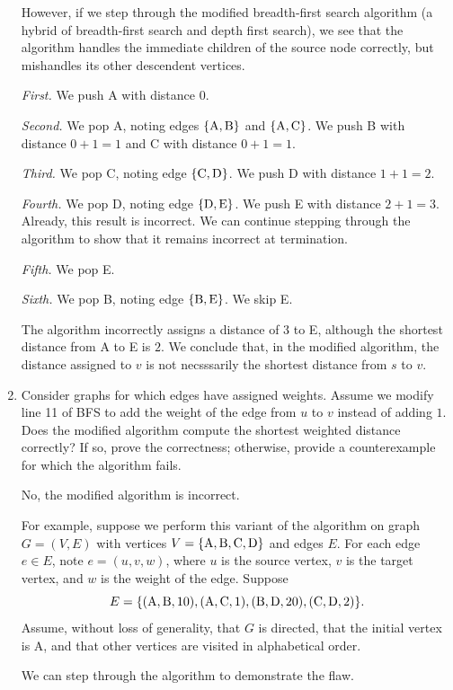\begin{enumerate}
\begin{solution}
However, if we step through the modified breadth-first search algorithm (a hybrid of breadth-first search and depth first search), we see that the algorithm handles the immediate children of the source node correctly, but mishandles its other descendent vertices.

\textit{First. }We push A with distance $0$.

\textit{Second. }We pop A, noting edges $\{{\rm A},{\rm B}\}$ and $\{{\rm A},{\rm C}\}$. We push B with distance $0+1=1$ and C with distance $0+1=1$.

\textit{Third. }We pop C, noting edge $\{{\rm C},{\rm D}\}$. We push D with distance $1+1=2$.

\textit{Fourth. }We pop D, noting edge $\{{\rm D},{\rm E}\}$. We push E with distance $2+1=3$. Already, this result is incorrect. We can continue stepping through the algorithm to show that it remains incorrect at termination.

\textit{Fifth. }We pop E.

\textit{Sixth. }We pop B, noting edge $\{{\rm B},{\rm E}\}$. We skip E.

The algorithm incorrectly assigns a distance of $3$ to E, although the shortest distance from A to E is $2$. We conclude that, in the modified algorithm, the distance assigned to $v$ is not necsssarily the shortest distance from $s$ to $v$.
\end{solution}
\newpage
\item Consider graphs for which edges have assigned weights. Assume we modify line 11 of BFS to add the weight of the edge from $u$ to $v$ instead of adding $1$. Does the modified algorithm compute the shortest weighted distance correctly? If so, prove the correctness; otherwise, provide a counterexample for which the algorithm fails.
\begin{solution}
No, the modified algorithm is incorrect.

For example, suppose we perform this variant of the algorithm on graph $G=(V,E)$ with vertices $V=\{{\rm A},{\rm B},{\rm C},{\rm D}\}$ and edges $E$. For each edge $e\in E$, note $e=(u,v,w)$, where $u$ is the source vertex, $v$ is the target vertex, and $w$ is the weight of the edge. Suppose \[E=\{({\rm A},{\rm B},10),({\rm A},{\rm C},1),({\rm B},{\rm D},20),({\rm C},{\rm D},2)\}.\] Assume, without loss of generality, that $G$ is directed, that the initial vertex is A, and that other vertices are visited in alphabetical order.

We can step through the algorithm to demonstrate the flaw.


\end{solution}
\end{enumerate}
